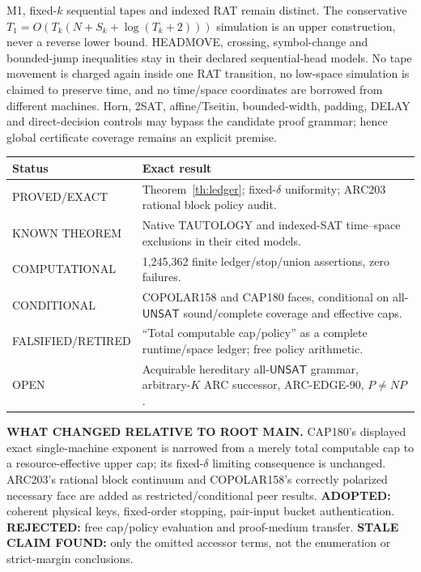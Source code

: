 \documentclass[11pt]{article}
\newcommand{\UNSAT}{\mathsf{UNSAT}}
\begin{document}
M1, fixed-$k$ sequential tapes and indexed RAT remain distinct.  The
conservative $T_1=O(T_k(N+S_k+\log(T_k+2)))$ simulation is an upper
construction, never a reverse lower bound.  HEADMOVE, crossing, symbol-change
and bounded-jump inequalities stay in their declared sequential-head models.
No tape movement is charged again inside one RAT transition, no low-space
simulation is claimed to preserve time, and no time/space coordinates are
borrowed from different machines.  Horn, 2SAT, affine/Tseitin, bounded-width,
padding, DELAY and direct-decision controls may bypass the candidate proof
grammar; hence global certificate coverage remains an explicit premise.

\begin{center}\small
\begin{tabularx}{.96\linewidth}{p{.20\linewidth}X}\toprule
Status & Exact result\\\midrule
PROVED/EXACT & Theorem~\ref{th:ledger}; fixed-$\delta$ uniformity; ARC203 rational block policy audit.\\
KNOWN THEOREM & Native TAUTOLOGY and indexed-SAT time--space exclusions in their cited models.\\
COMPUTATIONAL & 1,245,362 finite ledger/stop/union assertions, zero failures.\\
CONDITIONAL & COPOLAR158 and CAP180 faces, conditional on all-$\UNSAT$ sound/complete coverage and effective caps.\\
FALSIFIED/RETIRED & ``Total computable cap/policy'' as a complete runtime/space ledger; free policy arithmetic.\\
OPEN & Acquirable hereditary all-$\UNSAT$ grammar, arbitrary-$K$ ARC successor, ARC-EDGE-90, $P\ne NP$.\\\bottomrule
\end{tabularx}\end{center}

\textbf{WHAT CHANGED RELATIVE TO ROOT MAIN.}  CAP180's displayed exact
single-machine exponent is narrowed from a merely total computable cap to a
resource-effective upper cap; its fixed-$\delta$ limiting consequence is
unchanged.  ARC203's rational block continuum and COPOLAR158's correctly
polarized necessary face are added as restricted/conditional peer results.
\textbf{ADOPTED:} coherent physical keys, fixed-order stopping, pair-input
bucket authentication.  \textbf{REJECTED:} free cap/policy evaluation and
proof-medium transfer.  \textbf{STALE CLAIM FOUND:} only the omitted
accessor terms, not the enumeration or strict-margin conclusions.
\end{document}
